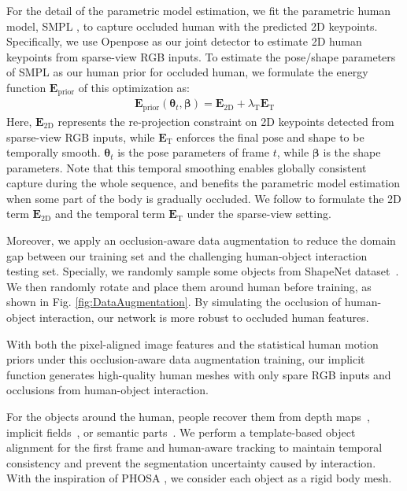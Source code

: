 For the detail of the parametric model estimation, we fit the parametric human model, SMPL \citep{SMPL2015}, to capture occluded human with the predicted 2D keypoints.
%
Specifically, we use Openpose \citep{Openpose} as our joint detector to estimate 2D human keypoints from sparse-view RGB inputs.
%
To estimate the pose/shape parameters of SMPL as our human prior for occluded human, we formulate the energy function $\boldsymbol{E}_{\mathrm{prior}}$ of this optimization as:
\begin{align} \label{eq:opt}
	\boldsymbol{E}_{\mathrm{prior}}(\boldsymbol{\theta}_t, \boldsymbol{\beta}) = \boldsymbol{E}_{\mathrm{2D}} + \lambda_{\mathrm{T}}\boldsymbol{E}_{\mathrm{T}}
\end{align}
% 
Here, $\boldsymbol{E}_{\mathrm{2D}}$ represents the re-projection constraint on 2D keypoints detected from sparse-view RGB inputs, while $\boldsymbol{E}_{\mathrm{T}}$ enforces the final pose and shape to be temporally smooth.
%
$\boldsymbol{\theta}_t$ is the pose parameters of frame $t$, while $\boldsymbol{\beta}$ is the shape parameters.
%
Note that this temporal smoothing enables globally consistent capture during the whole sequence, and benefits the parametric model estimation when some part of the body is gradually occluded.
%
We follow \cite{he2021challencap} to formulate the 2D term $\boldsymbol{E}_{\mathrm{2D}}$ and the temporal term $\boldsymbol{E}_{\mathrm{T}}$ under the sparse-view setting.
%

Moreover, we apply an occlusion-aware data augmentation to reduce the domain gap between our training set and the challenging human-object interaction testing set.
%
Specially, we randomly sample some objects from ShapeNet dataset~\cite{chang2015shapenet}.
%
We then randomly rotate and place them around human before training, as shown in Fig. \ref{fig:DataAugmentation}.
%
By simulating the occlusion of human-object interaction, our network is more robust to occluded human features.

With both the pixel-aligned image features and the statistical human motion priors under this occlusion-aware data augmentation training, our implicit function generates high-quality human meshes with only spare RGB inputs and occlusions from human-object interaction.

%
For the objects around the human, people recover them from depth maps~\cite{new2011kinect}, implicit fields~\cite{mescheder2019occupancy}, or semantic parts~\cite{chen2018autosweep}. We perform a template-based object alignment for the first frame and human-aware tracking to maintain temporal consistency and prevent the segmentation uncertainty caused by interaction. With the inspiration of PHOSA \cite{2020phosa_Arrangements}, we consider each object as a rigid body mesh.


